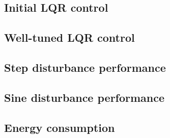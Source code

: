 \subsection{Initial LQR control}

\subsection{Well-tuned LQR control}

\subsection{Step disturbance performance}

\subsection{Sine disturbance performance}

\subsection{Energy consumption}